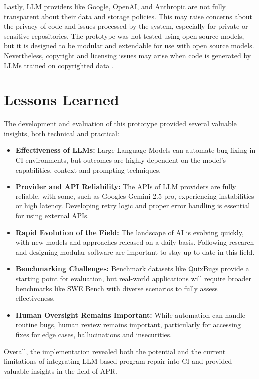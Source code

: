 Lastly, \ac{LLM} providers like Google, OpenAI, and Anthropic are not fully transparent about their data and storage policies. This may raise concerns about the privacy of code and issues processed by the system, especially for private or sensitive repositories. The prototype was not tested using open source models, but it is designed to be modular and extendable for use with open source models. Nevertheless, copyright and licensing issues may arise when code is generated by \acp{LLM} trained on copyrighted data \cite{sauvolaFutureSoftwareDevelopment2024, houLargeLanguageModels2024}.

\section{Lessons Learned}
The development and evaluation of this prototype provided several valuable insights, both technical and practical:

\begin{itemize}
    \item \textbf{Effectiveness of \acp{LLM}:} Large Language Models can automate bug fixing in CI environments, but outcomes are highly dependent on the model's capabilities, context and prompting techniques.
    \item \textbf{Provider and API Reliability:} The APIs of \ac{LLM} providers are fully reliable, with some, such as Googles Gemini-2.5-pro, experiencing instabilities or high latency. Developing retry logic and proper error handling is essential for using external APIs.
    \item \textbf{Rapid Evolution of the Field:} The landscape of AI is evolving quickly, with new models and approaches released on a daily basis. Following research and designing modular software are important to stay up to date in this field.
    \item \textbf{Benchmarking Challenges:} Benchmark datasets like QuixBugs provide a starting point for evaluation, but real-world applications will require broader benchmarks like SWE Bench with diverse scenarios to fully assess effectiveness.
    \item \textbf{Human Oversight Remains Important:} While automation can handle routine bugs, human review remains important, particularly for accessing fixes for edge cases, hallucinations and insecurities.
\end{itemize}

Overall, the implementation revealed both the potential and the current limitations of integrating LLM-based program repair into CI and provided valuable insights in the field of \ac{APR}.


